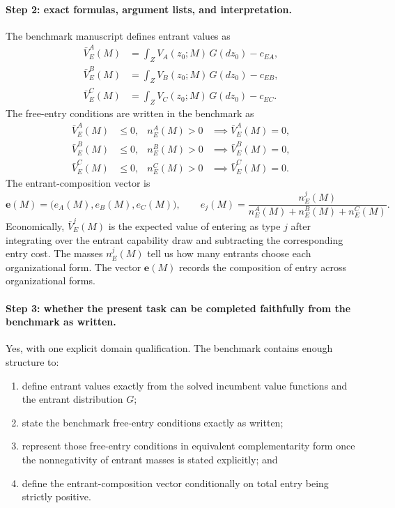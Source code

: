 \paragraph{Step 2: exact formulas, argument lists, and interpretation.}
The benchmark manuscript defines entrant values as
\begin{align*}
\bar V_E^A(M)&=\int_Z V_A(z_0;M)\,G(dz_0)-c_{EA},\\
\bar V_E^B(M)&=\int_Z V_B(z_0;M)\,G(dz_0)-c_{EB},\\
\bar V_E^C(M)&=\int_Z V_C(z_0;M)\,G(dz_0)-c_{EC}.
\end{align*}
The free-entry conditions are written in the benchmark as
\begin{align*}
\bar V_E^A(M) &\le 0, & n_E^A(M)>0 &\implies \bar V_E^A(M)=0,\\
\bar V_E^B(M) &\le 0, & n_E^B(M)>0 &\implies \bar V_E^B(M)=0,\\
\bar V_E^C(M) &\le 0, & n_E^C(M)>0 &\implies \bar V_E^C(M)=0.
\end{align*}
The entrant-composition vector is
\[
\mathbf e(M)=\bigl(e_A(M),e_B(M),e_C(M)\bigr),
\qquad
e_j(M)=\frac{n_E^j(M)}{n_E^A(M)+n_E^B(M)+n_E^C(M)}.
\]
Economically, $\bar V_E^j(M)$ is the expected value of entering as type $j$ after integrating over the entrant capability draw and subtracting the corresponding entry cost. The masses $n_E^j(M)$ tell us how many entrants choose each organizational form. The vector $\mathbf e(M)$ records the composition of entry across organizational forms.

\paragraph{Step 3: whether the present task can be completed faithfully from the benchmark as written.}
Yes, with one explicit domain qualification. The benchmark contains enough structure to:
\begin{enumerate}
    \item define entrant values exactly from the solved incumbent value functions and the entrant distribution $G$;
    \item state the benchmark free-entry conditions exactly as written;
    \item represent those free-entry conditions in equivalent complementarity form once the nonnegativity of entrant masses is stated explicitly; and
    \item define the entrant-composition vector conditionally on total entry being strictly positive.
\end{enumerate}

